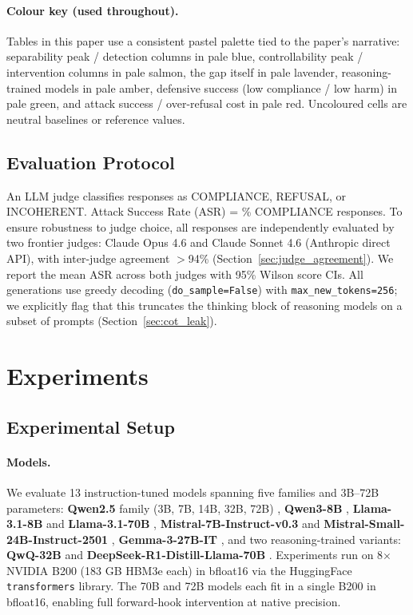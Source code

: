 \documentclass{article}
\begin{document}
\paragraph{Colour key (used throughout).} Tables in this paper use a consistent pastel palette tied to the paper's narrative: \colorbox{sepshade}{separability peak / detection} columns in pale blue, \colorbox{ctrlshade}{controllability peak / intervention} columns in pale salmon, \colorbox{gapshade}{the gap itself} in pale lavender, \colorbox{reasoning}{reasoning-trained models} in pale amber, \colorbox{goodshade}{defensive success} (low compliance / low harm) in pale green, and \colorbox{badshade}{attack success / over-refusal cost} in pale red. Uncoloured cells are neutral baselines or reference values.

\subsection{Evaluation Protocol}

An LLM judge classifies responses as COMPLIANCE, REFUSAL, or INCOHERENT. Attack Success Rate (ASR) = \% COMPLIANCE responses. To ensure robustness to judge choice, all responses are independently evaluated by two frontier judges: Claude Opus 4.6 and Claude Sonnet 4.6 (Anthropic direct API), with inter-judge agreement $>$94\% (Section~\ref{sec:judge_agreement}). We report the mean ASR across both judges with 95\% Wilson score CIs. All generations use greedy decoding (\texttt{do\_sample=False}) with \texttt{max\_new\_tokens=256}; we explicitly flag that this truncates the thinking block of reasoning models on a subset of prompts (Section~\ref{sec:cot_leak}).

\section{Experiments}

\subsection{Experimental Setup}

\paragraph{Models.} We evaluate 13 instruction-tuned models spanning five families and 3B--72B parameters:
\textbf{Qwen2.5} family (3B, 7B, 14B, 32B, 72B) \citep{qwen25}, \textbf{Qwen3-8B} \citep{qwen3}, \textbf{Llama-3.1-8B} and \textbf{Llama-3.1-70B} \citep{grattafiori2024llama}, \textbf{Mistral-7B-Instruct-v0.3} and \textbf{Mistral-Small-24B-Instruct-2501} \citep{mistral_small3}, \textbf{Gemma-3-27B-IT} \citep{team2024gemma}, and two reasoning-trained variants: \textbf{QwQ-32B} \citep{qwq32b} and \textbf{DeepSeek-R1-Distill-Llama-70B} \citep{deepseekr1}. Experiments run on 8$\times$NVIDIA B200 (183 GB HBM3e each) in bfloat16 via the HuggingFace \texttt{transformers} library. The 70B and 72B models each fit in a single B200 in bfloat16, enabling full forward-hook intervention at native precision.
\end{document}
